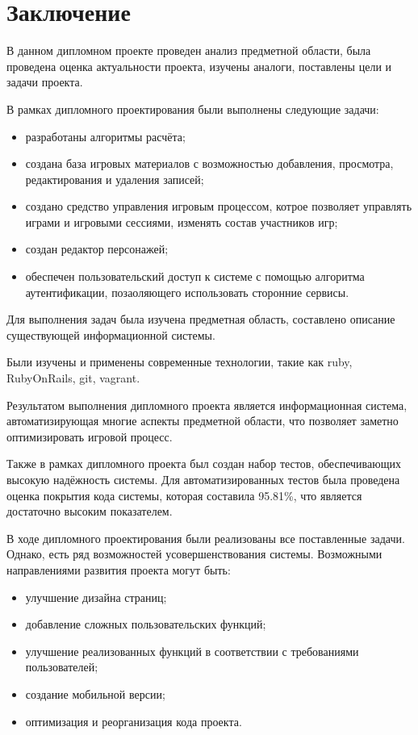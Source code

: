 \section*{Заключение}

В данном дипломном проекте проведен анализ предметной области, была проведена оценка актуальности проекта, изучены аналоги, поставлены цели и задачи проекта.

В рамках дипломного проектирования были выполнены следующие задачи:
\begin{itemize}
\item разработаны алгоритмы расчёта;
\item создана база игровых материалов с возможностью добавления, просмотра, редактирования и удаления записей;
\item создано средство управления игровым процессом, котрое позволяет управлять играми и игровыми сессиями, изменять состав участников игр;
\item создан редактор персонажей;
\item обеспечен пользовательский доступ к системе с помощью алгоритма аутентификации, позаоляющего использовать сторонние сервисы.
\end{itemize}

Для выполнения задач была изучена предметная область, составлено описание существующей информационной системы.

Были изучены и применены современные технологии, такие как ruby, RubyOnRails, git, vagrant.

Результатом выполнения дипломного проекта является информационная система, автоматизирующая многие аспекты предметной области, что позволяет заметно оптимизировать игровой процесс.

Также в рамках дипломного проекта был создан набор тестов, обеспечивающих высокую надёжность системы. Для автоматизированных тестов была проведена оценка покрытия кода системы, которая составила 95.81\%, что является достаточно высоким показателем.

В ходе дипломного проектирования были реализованы все поставленные задачи. Однако, есть ряд возможностей усовершенствования системы. Возможными направлениями развития проекта могут быть:
\begin{itemize}
\item улучшение дизайна страниц;
\item добавление сложных пользовательских функций;
\item улучшение реализованных функций в соответствии с требованиями пользователей;
\item создание мобильной версии;
\item оптимизация и реорганизация кода проекта.
\end{itemize}


\pagebreak
